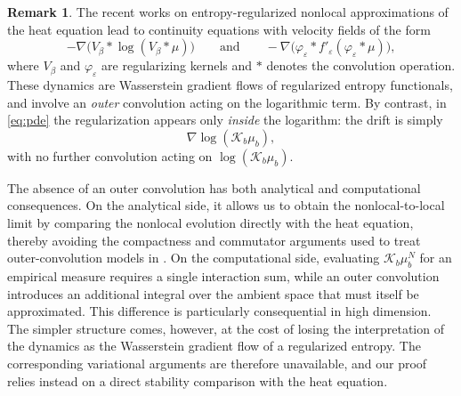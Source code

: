 \documentclass[11pt]{article}
\theoremstyle{definition}
\newtheorem{remark}[theorem]{Remark}
\def\Kb{\mathcal K_b}
\begin{document}
\begin{remark}\label{r:singleconv}
The recent works \cite{craig2025nonlocal,carrillo2024nonlocallinear}  on entropy-regularized nonlocal approximations of
the heat equation lead to continuity equations with velocity fields of the form
\[
-\nabla\bigl(V_\beta*\log(V_\beta*\mu)\bigr)
\qquad\text{and}\qquad
-\nabla\bigl(\varphi_\varepsilon*f'_\varepsilon(\varphi_\varepsilon*\mu)\bigr),
\]
where \(V_\beta\) and \(\varphi_\varepsilon\) are regularizing kernels and $*$ denotes the convolution operation. These
dynamics are Wasserstein gradient flows of regularized entropy functionals, and
involve an \emph{outer} convolution acting on the logarithmic term. By contrast,
in \eqref{eq:pde} the regularization appears only \emph{inside} the logarithm:
the drift is simply
\[
\nabla\log(\Kb\mu_b),
\]
with no further convolution acting on \(\log(\Kb\mu_b)\).


The absence of an outer convolution has both analytical and computational consequences. On the analytical side, it allows us to obtain the nonlocal-to-local limit by comparing the nonlocal evolution directly with the heat equation, thereby avoiding the compactness and commutator arguments used to treat outer-convolution models in \cite{craig2025nonlocal,carrillo2024nonlocallinear}. On the computational side, evaluating \(\Kb\mu_b^N\) for an empirical measure requires a single interaction sum, while an outer convolution introduces an additional integral over the ambient space that must itself be approximated. This difference is particularly consequential in high dimension. The simpler structure comes, however, at the cost of losing the interpretation of the dynamics as the Wasserstein gradient flow of a regularized entropy. The corresponding variational arguments are therefore unavailable, and our proof relies instead on a direct stability comparison with the heat equation.

\end{remark}
\end{document}
